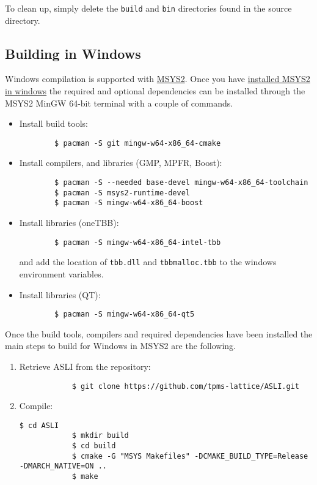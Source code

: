 To clean up, simply delete the \texttt{build} and \texttt{bin} directories found in the source directory.

\subsection{Building \asli{} in Windows}\label{sec:buildWin}
Windows compilation is supported with \href{https://www.msys2.org/}{MSYS2}. Once you have \href{https://www.msys2.org/#installation}{installed MSYS2 in windows} the required and optional dependencies can be installed through the MSYS2 MinGW 64-bit terminal with a couple of commands.

\begin{itemize}
	\item Install build tools:  
	\begin{verbatim}
		$ pacman -S git mingw-w64-x86_64-cmake
	\end{verbatim}

	\item Install compilers, and libraries (GMP, MPFR, Boost):  
	\begin{verbatim}
		$ pacman -S --needed base-devel mingw-w64-x86_64-toolchain
		$ pacman -S msys2-runtime-devel
		$ pacman -S mingw-w64-x86_64-boost
	\end{verbatim}

	\item Install libraries (oneTBB):
	\begin{verbatim}
		$ pacman -S mingw-w64-x86_64-intel-tbb
	\end{verbatim}
	and add the location of \texttt{tbb.dll} and \texttt{tbbmalloc.tbb} to the windows environment variables.

	\item Install libraries (QT):
	\begin{verbatim}
		$ pacman -S mingw-w64-x86_64-qt5
	\end{verbatim}
\end{itemize}

Once the build tools, compilers and required dependencies have been installed the main steps to build \asli{} for Windows in MSYS2 are the following.
\begin{enumerate}
	\item Retrieve ASLI from the repository:
		\begin{verbatim}
			$ git clone https://github.com/tpms-lattice/ASLI.git
		\end{verbatim}
	\item Compile:
		\begin{Verbatim}[breaklines=true, tabsize=0]
			$ cd ASLI
			$ mkdir build
			$ cd build
			$ cmake -G "MSYS Makefiles" -DCMAKE_BUILD_TYPE=Release -DMARCH_NATIVE=ON ..
			$ make
		\end{Verbatim}
\end{enumerate}

